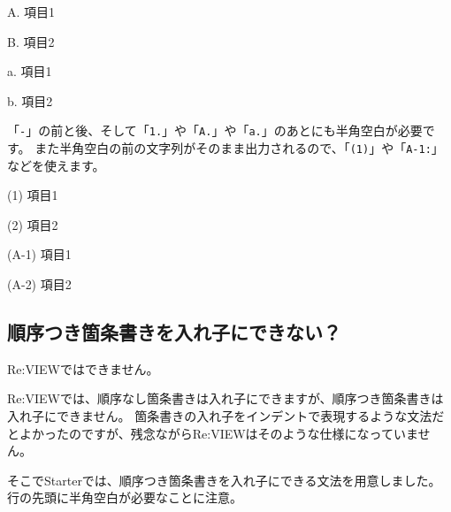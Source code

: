 \begin{starterenumerate}
\item[A.] 項目1
\item[B.] 項目2
\end{starterenumerate}

\begin{starterenumerate}
\item[a.] 項目1
\item[b.] 項目2
\end{starterenumerate}

\endstarterresult

「\texttt{{-}}」の前と後、そして「\texttt{1.}」や「\texttt{A.}」や「\texttt{a.}」のあとにも半角空白が必要です。
また半角空白の前の文字列がそのまま出力されるので、「\texttt{(1)}」や「\texttt{A{-}1:}」などを使えます。

\begin{starterprogram}\end{starterprogram}
\noindent
{}

\starterresult

\begin{starterenumerate}
\item[(1)] 項目1
\item[(2)] 項目2
\end{starterenumerate}

\begin{starterenumerate}
\item[(A{-}1)] 項目1
\item[(A{-}2)] 項目2
\end{starterenumerate}

\endstarterresult

\subsection*{順序つき箇条書きを入れ子にできない？}
\label{sec:2-2-3}

Re:VIEWではできません。

Re:VIEWでは、順序なし箇条書きは入れ子にできますが、順序つき箇条書きは入れ子にできません。
箇条書きの入れ子をインデントで表現するような文法だとよかったのですが、残念ながらRe:VIEWはそのような仕様になっていません。

そこでStarterでは、順序つき箇条書きを入れ子にできる文法を用意しました。
行の先頭に半角空白が必要なことに注意。

